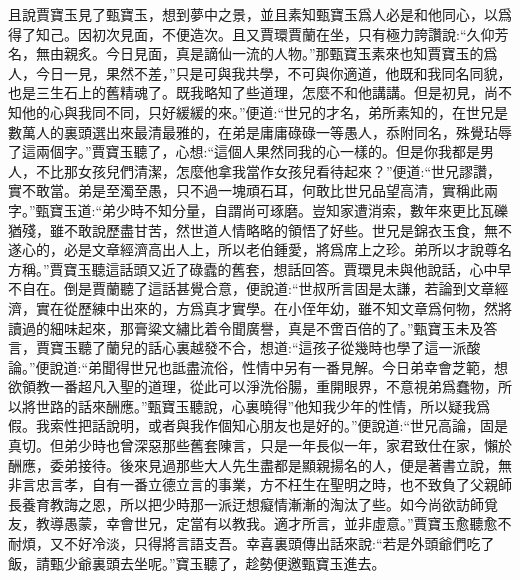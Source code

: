 \begin{parag}
    且說賈寶玉見了甄寶玉，想到夢中之景，並且素知甄寶玉爲人必是和他同心，以爲得了知己。因初次見面，不便造次。且又賈環賈蘭在坐，只有極力誇讚說:“久仰芳名，無由親炙。今日見面，真是謫仙一流的人物。”那甄寶玉素來也知賈寶玉的爲人，今日一見，果然不差，”只是可與我共學，不可與你適道，他既和我同名同貌，也是三生石上的舊精魂了。既我略知了些道理，怎麼不和他講講。但是初見，尚不知他的心與我同不同，只好緩緩的來。”便道:“世兄的才名，弟所素知的，在世兄是數萬人的裏頭選出來最清最雅的，在弟是庸庸碌碌一等愚人，忝附同名，殊覺玷辱了這兩個字。”賈寶玉聽了，心想:“這個人果然同我的心一樣的。但是你我都是男人，不比那女孩兒們清潔，怎麼他拿我當作女孩兒看待起來？”便道:“世兄謬讚，實不敢當。弟是至濁至愚，只不過一塊頑石耳，何敢比世兄品望高清，實稱此兩字。”甄寶玉道:“弟少時不知分量，自謂尚可琢磨。豈知家遭消索，數年來更比瓦礫猶殘，雖不敢說歷盡甘苦，然世道人情略略的領悟了好些。世兄是錦衣玉食，無不遂心的，必是文章經濟高出人上，所以老伯鍾愛，將爲席上之珍。弟所以才說尊名方稱。”賈寶玉聽這話頭又近了碌蠹的舊套，想話回答。賈環見未與他說話，心中早不自在。倒是賈蘭聽了這話甚覺合意，便說道:“世叔所言固是太謙，若論到文章經濟，實在從歷練中出來的，方爲真才實學。在小侄年幼，雖不知文章爲何物，然將讀過的細味起來，那膏粱文繡比着令聞廣譽，真是不啻百倍的了。”甄寶玉未及答言，賈寶玉聽了蘭兒的話心裏越發不合，想道:“這孩子從幾時也學了這一派酸論。”便說道:“弟聞得世兄也詆盡流俗，性情中另有一番見解。今日弟幸會芝範，想欲領教一番超凡入聖的道理，從此可以淨洗俗腸，重開眼界，不意視弟爲蠢物，所以將世路的話來酬應。”甄寶玉聽說，心裏曉得”他知我少年的性情，所以疑我爲假。我索性把話說明，或者與我作個知心朋友也是好的。”便說道:“世兄高論，固是真切。但弟少時也曾深惡那些舊套陳言，只是一年長似一年，家君致仕在家，懶於酬應，委弟接待。後來見過那些大人先生盡都是顯親揚名的人，便是著書立說，無非言忠言孝，自有一番立德立言的事業，方不枉生在聖明之時，也不致負了父親師長養育教誨之恩，所以把少時那一派迂想癡情漸漸的淘汰了些。如今尚欲訪師覓友，教導愚蒙，幸會世兄，定當有以教我。適才所言，並非虛意。”賈寶玉愈聽愈不耐煩，又不好冷淡，只得將言語支吾。幸喜裏頭傳出話來說:“若是外頭爺們吃了飯，請甄少爺裏頭去坐呢。”寶玉聽了，趁勢便邀甄寶玉進去。
\end{parag}


